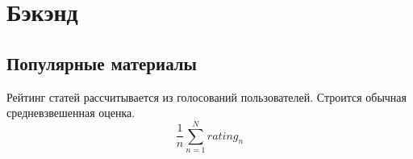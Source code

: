 \documentclass[DIV=calc, paper=a4, fontsize=11pt]{scrartcl} %
\begin{document}
\section{Бэкэнд}

\subsection{Популярные материалы}
Рейтинг статей рассчитывается из голосований пользователей. Строится обычная средневзвешенная оценка.
\begin{equation}
    \frac{1}{n} \sum\limits_{n=1}^{N} rating_n     
\end{equation}
\end{document}
